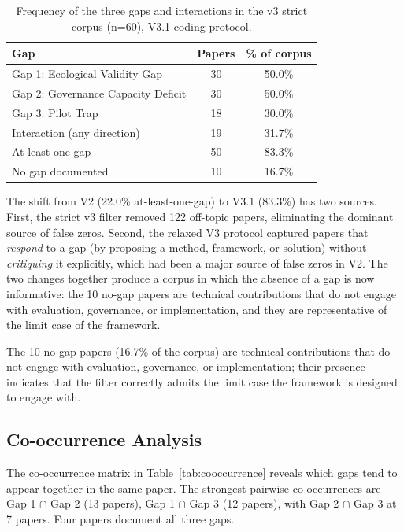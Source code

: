 \begin{table}[t]
  \centering
  \caption{Frequency of the three gaps and interactions in the
  v3 strict corpus (n=60), V3.1 coding protocol.}
  \label{tab:frequencies}
  \begin{tabular}{lcc}
    \toprule
    \textbf{Gap} & \textbf{Papers} & \textbf{\% of corpus} \\
    \midrule
    Gap 1: Ecological Validity Gap        & 30 & 50.0\% \\
    Gap 2: Governance Capacity Deficit    & 30 & 50.0\% \\
    Gap 3: Pilot Trap                     & 18 & 30.0\% \\
    Interaction (any direction)           & 19 & 31.7\% \\
    \midrule
    At least one gap                      & 50 & 83.3\% \\
    No gap documented                     & 10 & 16.7\% \\
    \bottomrule
  \end{tabular}
\end{table}

The shift from V2 (22.0\% at-least-one-gap) to V3.1 (83.3\%) has
two sources. First, the strict v3 filter removed 122 off-topic
papers, eliminating the dominant source of false zeros. Second, the
relaxed V3 protocol captured papers that \textit{respond} to a
gap (by proposing a method, framework, or solution) without
\textit{critiquing} it explicitly, which had been a major source
of false zeros in V2. The two changes together produce a corpus in
which the absence of a gap is now informative: the 10 no-gap
papers are technical contributions that do not engage with
evaluation, governance, or implementation, and they are
representative of the limit case of the framework.

The 10 no-gap papers (16.7\% of the corpus) are technical contributions
that do not engage with evaluation, governance, or implementation;
their presence indicates that the filter correctly admits the limit
case the framework is designed to engage with.

\subsection{Co-occurrence Analysis}
\label{sec:cooccurrence}

The co-occurrence matrix in Table~\ref{tab:cooccurrence} reveals
which gaps tend to appear together in the same paper. The
strongest pairwise co-occurrences are Gap 1 $\cap$ Gap 2 (13
papers), Gap 1 $\cap$ Gap 3 (12 papers), with Gap 2 $\cap$ Gap 3
at 7 papers. Four papers document all three gaps.

